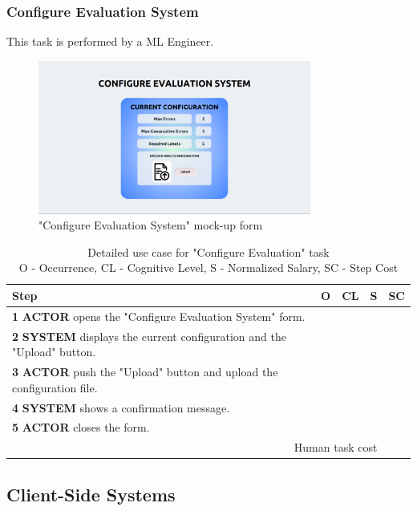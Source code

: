 \subsubsection{Configure Evaluation System}
This task is performed by a ML Engineer.

\begin{figure}[H]
\centering
\includegraphics[width=0.8\textwidth]{figures/ui_configure_evaluation.png}
\caption{"Configure Evaluation System" mock-up form}
\end{figure}

\begin{table}[H]
\centering
\begin{tabularx}{\textwidth}{|X|c|c|c|c|}
\hline
\textbf{Step} & \textbf{O} & \textbf{CL} & \textbf{S} & \textbf{SC} \\
\hline
\textbf{1} \textbf{ACTOR} opens the "Configure Evaluation System" form. &  & & & \\
\hline
\textbf{2} \textbf{SYSTEM} displays the current configuration and the "Upload" button.& & & & \\
\hline
\textbf{3} \textbf{ACTOR} push the "Upload" button and upload the configuration file. & & & &\\
\hline
\textbf{4} \textbf{SYSTEM} shows a confirmation message. & & & & \\
\hline
\textbf{5} \textbf{ACTOR} closes the form. & & & & \\
\hline
\multicolumn{4}{|r|}{Human task cost} & \\
\hline
\end{tabularx}
\caption{Detailed use case for "Configure Evaluation" task\\ 
O - Occurrence, CL - Cognitive Level, S - Normalized Salary, SC - Step Cost}
\label{table:configure_evaluation_system}
\end{table}

\subsection{Client-Side Systems}

